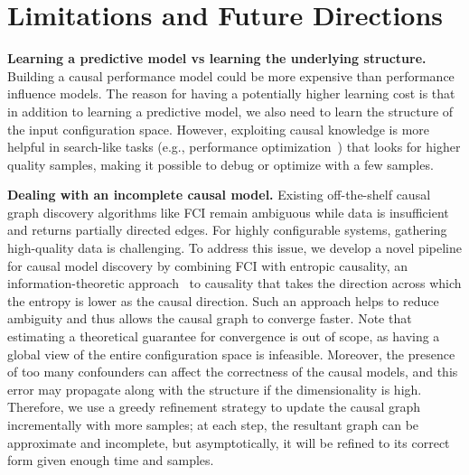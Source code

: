 \section{Limitations and Future Directions}
\label{sec:discussion}


\noindent \textbf{Learning a predictive model vs learning the underlying structure.}
Building a causal performance model could be more expensive than performance influence models. The reason for having a potentially higher learning cost is that in addition to learning a predictive model, we also need to learn the structure of the input configuration space.
However, exploiting causal knowledge is more helpful in search-like tasks (e.g., performance optimization~\cite{JC:MASCOTS16,JVKS:FSE18}) that looks for %
higher quality samples, making it possible to debug or optimize with a few samples.

\noindent \textbf{Dealing with an incomplete causal model.} Existing off-the-shelf causal graph discovery algorithms like FCI remain ambiguous while data is insufficient and returns partially directed edges. For highly configurable systems, gathering high-quality data is challenging. To address this issue, we develop a novel pipeline for causal model discovery by combining FCI with entropic causality, an information-theoretic approach~\cite{Kocaoglu2017} to causality that takes the direction across which the entropy is lower as the causal direction. Such an approach helps to reduce ambiguity and thus allows the causal graph to converge faster. Note that estimating a theoretical guarantee for convergence is out of scope, as having a global view of the entire configuration space is infeasible. Moreover,  the presence of too many confounders can affect the correctness of the causal models, and this error may propagate along with the structure if the dimensionality is high. Therefore, we use a greedy refinement strategy to update the causal graph incrementally with more samples; at each step, the resultant graph can be approximate and incomplete, but asymptotically, it will be refined to its correct form given enough time and samples.

